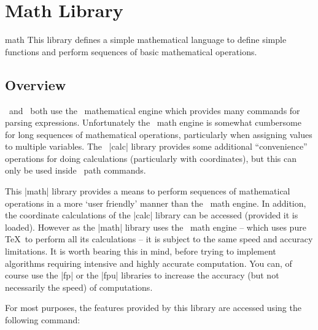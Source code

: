 %
%
%


\section[library-math]{Math Library}
\label{section-library-math}

\begin{tikzlibrary}{math}
    This library defines a simple mathematical language to define simple
    functions and perform sequences of basic mathematical operations.
\end{tikzlibrary}


\subsection{Overview}

\pgfname\ and \tikzname\ both use the \pgfname\ mathematical engine which
provides many commands for parsing expressions. Unfortunately the \pgfname\
math engine is somewhat cumbersome for long sequences of mathematical
operations, particularly when assigning values to multiple variables. The
\tikzname\ |calc| library provides some additional ``convenience'' operations
for doing calculations (particularly with coordinates), but this can only be
used inside \tikzname\ path commands.

This |math| library provides a means to perform sequences of mathematical
operations in a more `user friendly' manner than the \pgfname\ math engine. In
addition, the coordinate calculations of the |calc| library can be accessed
(provided it is loaded).
%
However as the |math| library uses the \pgfname\ math engine -- which uses pure
\TeX\ to perform all its calculations -- it is subject to the same speed and
accuracy limitations. It is worth bearing this in mind, before trying to
implement algorithms requiring intensive and highly accurate computation. You
can, of course use the |fp| or the |fpu| libraries to increase the accuracy
(but not necessarily the speed) of computations.

For most purposes, the features provided by this library are accessed using the
following command:

